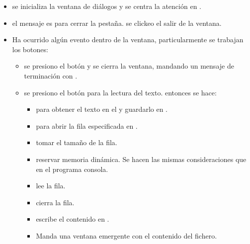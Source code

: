 \begin{itemize}
    \item {} se inicializa la ventana de diálogos
        y se centra la atención en .

    \item {} el mensaje es para cerrar la pestaña.
        se clickeo el salir de la ventana.

    \item {} Ha ocurrido algún evento dentro de
    la ventana, particularmente se trabajan los botones:
        \begin{itemize}
            \item {} se presiono el botón 
                 y se cierra la ventana, mandando un mensaje de terminación con
                 .

             \item {} se presiono el botón para
                 la lectura del texto. entonces se hace:
                 \begin{itemize}
                    \item {} para obtener el texto en el
                          y guardarlo en .

                    \item {} para abrir la fila especificada
                         en .

                    \item {} tomar el tamaño de la fila.

                    \item {} reservar memoria dinámica. Se
                        hacen las mismas consideraciones que en el programa consola.

                    \item {} lee la fila.

                    \item {} cierra la fila.

                    \item {} escribe el contenido en .

                    \item {} Manda una ventana emergente con
                        el contenido del fichero.


\end{itemize}
\end{itemize}
\end{itemize}
